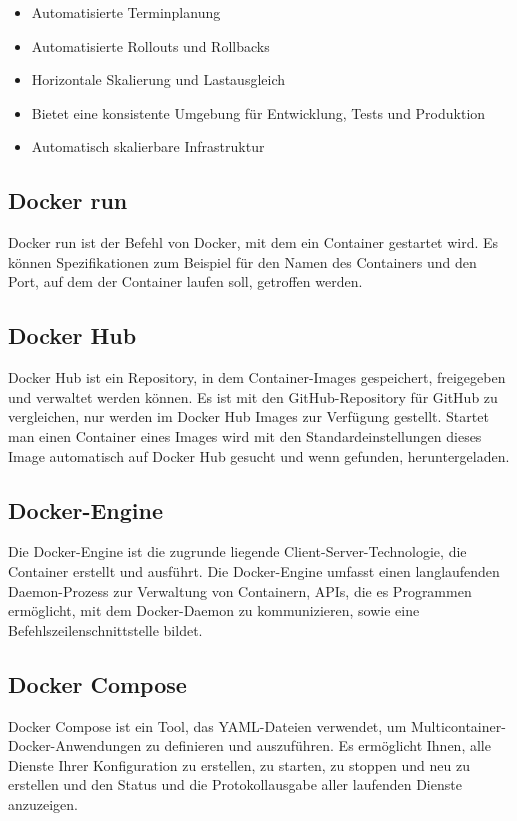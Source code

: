 \begin{itemize}
  \item Automatisierte Terminplanung
  \item Automatisierte Rollouts und Rollbacks
  \item Horizontale Skalierung und Lastausgleich
  \item Bietet eine konsistente Umgebung für Entwicklung, Tests und Produktion
  \item Automatisch skalierbare Infrastruktur
\end{itemize}

\subsection{Docker run}
Docker run ist der Befehl von Docker, mit dem ein Container gestartet wird.
Es können Spezifikationen zum Beispiel für den Namen des Containers und den Port, auf dem der Container
laufen soll, getroffen werden.

\subsection{Docker Hub}
Docker Hub ist ein Repository, in dem Container-Images gespeichert, freigegeben und verwaltet werden 
können. Es ist mit den GitHub-Repository für GitHub zu vergleichen, nur werden im Docker Hub Images 
zur Verfügung gestellt. Startet man einen Container eines Images wird mit den Standardeinstellungen dieses 
Image automatisch auf Docker Hub gesucht und wenn gefunden, heruntergeladen. \cite{noauthor_docker_nodate-1}

\subsection{Docker-Engine}
Die Docker-Engine ist die zugrunde liegende Client-Server-Technologie, die 
Container erstellt und ausführt. Die Docker-Engine umfasst einen 
langlaufenden Daemon-Prozess zur Verwaltung von Containern, APIs, die es 
Programmen ermöglicht, mit dem Docker-Daemon zu kommunizieren, sowie eine 
Befehlszeilenschnittstelle bildet.

\subsection{Docker Compose}
Docker Compose ist ein Tool, das YAML-Dateien verwendet, um Multicontainer-Docker-Anwendungen 
zu definieren und auszuführen. Es ermöglicht Ihnen, alle Dienste Ihrer Konfiguration zu erstellen, 
zu starten, zu stoppen und neu zu erstellen und den Status und die Protokollausgabe 
aller laufenden Dienste anzuzeigen.

